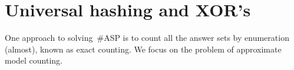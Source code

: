 \documentclass{article}
\def\asp{\textsf{\#ASP}\xspace}
\newcommand{\XOR}{\textsc{xor}} %
\newcommand{\sysfont}{\textit}
\newcommand{\xorro}{\sysfont{xorro}}
\begin{document}




%

\section{Universal hashing and XOR's} \label{sec:hashing}
%
%
One approach to solving~\asp is to count all the answer sets by enumeration (almost), known as exact counting.
%
We focus on the problem of approximate model counting. 
%
%
\end{document}
